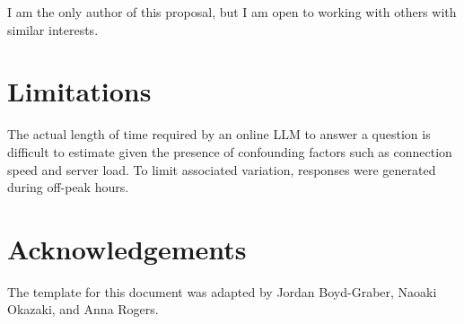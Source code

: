 \documentclass[11pt]{article}
\begin{document}
I am the only author of this proposal, but I am open to working with others with similar interests.

\section*{Limitations}

The actual length of time required by an online LLM to answer a question is difficult to estimate given the presence of confounding factors such as connection speed and server load. To limit associated variation, responses were generated during off-peak hours.

\section*{Acknowledgements}
The template for this document was adapted by Jordan Boyd-Graber, Naoaki Okazaki, and Anna Rogers.



\end{document}
